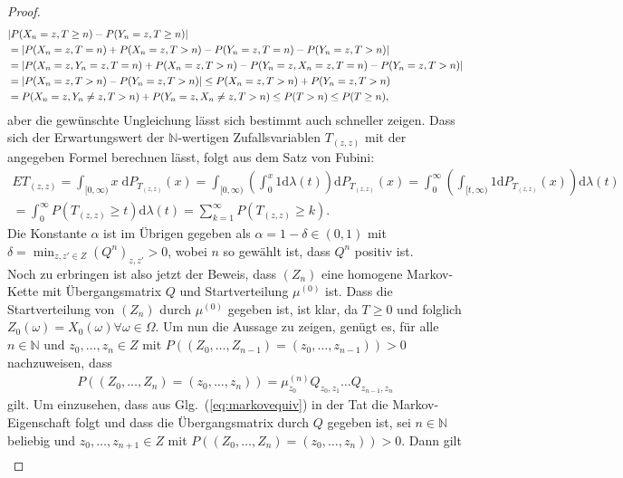 \documentclass[twoside]{article}
\theoremstyle{definition}
\begin{document}
\begin{proof}
\begin{align}
&\abs{P(X_n=z,T \geq n) - P(Y_n=z,T \geq n)} \\
&=\abs{P(X_n=z,T = n) + P(X_n=z,T > n) - P(Y_n=z,T = n) - P(Y_n=z,T > n)}\\
&= \abs{P(X_n=z,Y_n=z,T = n) + P(X_n=z,T > n) - P(Y_n=z,X_n=z,T = n) - P(Y_n=z,T > n)}\\
&= \abs{P(X_n=z,T > n) - P(Y_n=z,T > n)} \leq P(X_n=z,T > n) + P(Y_n=z,T > n) \\
&=P(X_n=z,Y_n \neq z,T > n) + P(Y_n=z,X_n \neq z, T > n) \leq P(T>n) \leq P(T \geq n),
\end{align}
aber die gewünschte Ungleichung lässt sich bestimmt auch schneller zeigen. Dass sich der Erwartungswert der $\mathbb{N}$-wertigen Zufallsvariablen $T_{(z,z)}$ mit der angegeben Formel berechnen lässt, folgt aus dem Satz von Fubini:
\begin{align}
ET_{(z,z)} = \int_{[0,\infty)} x \; \mathrm{d}P_{T_{(z,z)}}(x) = \int_{[0,\infty)} \left(\int_0^x 1 \mathrm{d}\lambda(t) \right) \mathrm{d}P_{T_{(z,z)}}(x) = \int_0^{\infty} \left(\int_{[t,\infty)} 1 \mathrm{d}P_{T_{(z,z)}}(x) \right) \mathrm{d}\lambda(t)\\
= \int_0^{\infty} P(T_{(z,z)} \geq t)   \mathrm{d}\lambda(t) = \sum_{k=1}^\infty P(T_{(z,z)} \geq k).
\end{align}
Die Konstante $\alpha$ ist im Übrigen gegeben als $\alpha = 1 - \delta \in (0,1)$ mit $\delta = \min_{z,z' \in Z} (Q^n)_{z,z'} >0$, wobei $n$ so gewählt ist, dass $Q^n$ positiv ist.\\
Noch zu erbringen ist also jetzt der Beweis, dass $(Z_n)$ eine homogene Markov-Kette mit Übergangsmatrix $Q$ und Startverteilung $\mu^{(0)}$ ist. Dass die Startverteilung von $(Z_n)$ durch $\mu^{(0)}$ gegeben ist, ist klar, da $T \geq 0$ und folglich $Z_0(\omega) = X_0(\omega) \forall \omega \in \Omega$. Um nun die Aussage zu zeigen, genügt es, für alle $n \in \mathbb{N}$ und $z_0, \dots , z_n \in Z$ mit $P((Z_0, \dots, Z_{n-1}) = (z_0, \dots, z_{n-1}))>0$ nachzuweisen, dass
\begin{align}
P((Z_0,\dots,Z_n)=(z_0,\dots,z_n))= \mu_{z_0}^{(n)} Q_{z_0,z_1} \dots Q_{z_{n-1},z_n} \label{eq:markovequiv}
\end{align}
gilt. Um einzusehen, dass aus Glg.\ (\ref{eq:markovequiv}) in der Tat die Markov-Eigenschaft folgt und dass die Übergangsmatrix durch $Q$ gegeben ist, sei $n \in \mathbb{N}$ beliebig und $z_0, \dots, z_{n+1} \in Z$ mit $P((Z_0 , \dots , Z_n) = (z_0, \dots , z_n))>0$. Dann gilt 
\begin{align}

\end{align}
\end{proof}
\end{document}
